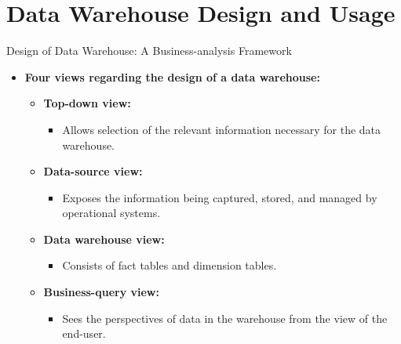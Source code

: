 \section{Data Warehouse Design and Usage}

\begin{frame}{Design of Data Warehouse: A Business-analysis Framework}
  \begin{itemize}
  \item \textbf{Four views regarding the design of a data warehouse:}
    \begin{itemize}
    \item \textbf{\color{airforceblue}Top-down view:}
      \begin{itemize}
      \item Allows selection of the relevant information necessary for the data warehouse.
      \end{itemize}
    \item \textbf{\color{airforceblue}Data-source view:}
      \begin{itemize}
      \item Exposes the information being captured, stored, and managed by operational systems.
      \end{itemize}
    \item \textbf{\color{airforceblue}Data warehouse view:}
      \begin{itemize}
      \item Consists of fact tables and dimension tables.
      \end{itemize}
    \item \textbf{\color{airforceblue}Business-query view:}
      \begin{itemize}
      \item Sees the perspectives of data in the warehouse from the view of the end-user.
      \end{itemize}
    \end{itemize}
  \end{itemize}
\end{frame}

